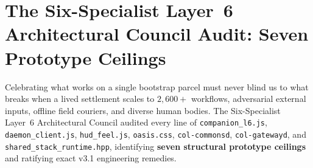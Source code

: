 \section{The Six-Specialist Layer~6 Architectural Council Audit: Seven Prototype Ceilings}
\label{sec:council-audit-l6}

Celebrating what works on a single bootstrap parcel must never blind us to what breaks when a lived settlement scales to $2{,}600+$ workflows, adversarial external inputs, offline field couriers, and diverse human bodies. The Six-Specialist Layer~6 Architectural Council audited every line of \texttt{companion\_l6.js}, \texttt{daemon\_client.js}, \texttt{hud\_feel.js}, \texttt{oasis.css}, \texttt{col-commonsd}, \texttt{col-gatewayd}, and \texttt{shared\_stack\_runtime.hpp}, identifying \textbf{seven structural prototype ceilings} and ratifying exact v3.1 engineering remedies.

